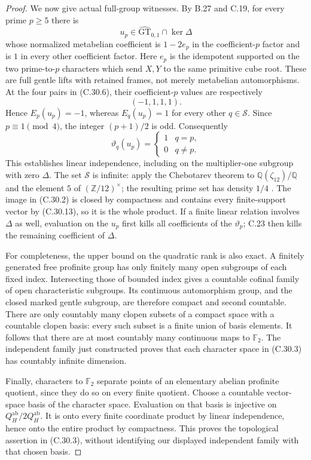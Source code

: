 \begin{proof}
We now give actual full-group witnesses. By B.27 and C.19, for every
prime $p\geq5$ there is
\[
 u_p\in\widehat{\mathrm{GT}}_{0,1}\cap\ker\Delta
\]
whose normalized metabelian coefficient is $1-2e_p$ in the
coefficient-$p$ factor and is $1$ in every other coefficient factor.
Here $e_p$ is the idempotent supported on the two prime-to-$p$
characters which send $X,Y$ to the same primitive cube root.
These are full gentle lifts with retained frames, not merely
metabelian automorphisms. At the four pairs in (C.30.6), their
coefficient-$p$ values are respectively
\[
                         (-1,1,1,1).
 \tag{C.30.12}
\]
Hence $E_p(u_p)=-1$, whereas $E_q(u_p)=1$ for every other
$q\in\mathcal S$. Since $p\equiv1\pmod4$, the integer
$(p+1)/2$ is odd. Consequently
\[
          \vartheta_q(u_p)=\begin{cases}1&q=p,\\0&q\ne p.
                                  \end{cases}
 \tag{C.30.13}
\]
This establishes linear independence, including on the
multiplier-one subgroup with zero $\Delta$.
The set $\mathcal S$ is infinite: apply the Chebotarev theorem to
$\mathbb Q(\zeta_{12})/\mathbb Q$ and the element $5$ of
$(\mathbb Z/12)^\times$; the resulting prime set has density $1/4$
\cite[Chapter V, Theorem 3.23, p.~164]{PBC_MilneCFT}.
The image in (C.30.2) is closed by compactness and contains every
finite-support vector by (C.30.13), so it is the whole product.
If a finite linear relation involves $\Delta$ as well, evaluation
on the $u_p$ first kills all coefficients of the $\vartheta_p$;
C.23 then kills the remaining coefficient of $\Delta$.

For completeness, the upper bound on the quadratic rank is also
exact. A finitely generated free profinite group has only finitely
many open subgroups of each fixed index. Intersecting those of
bounded index gives a countable cofinal family of open characteristic
subgroups. Its continuous automorphism group, and the closed marked
gentle subgroup, are therefore compact and second countable.
There are only countably many clopen subsets of a compact space
with a countable clopen basis: every such subset is a finite union
of basis elements. It follows that there are at most countably
many continuous maps to $\mathbb F_2$. The independent family just
constructed proves that each character space in (C.30.3) has
countably infinite dimension.

Finally, characters to $\mathbb F_2$ separate points of an elementary
abelian profinite quotient, since they do so on every finite quotient.
Choose a countable vector-space basis of the character space.
Evaluation on that basis is injective on
$Q_H^{\mathrm{ab}}/2Q_H^{\mathrm{ab}}$. It is onto every finite
coordinate product by linear independence, hence onto the entire
product by compactness. This proves the topological assertion in
(C.30.3), without identifying our displayed independent family with
that chosen basis.


\end{proof}
